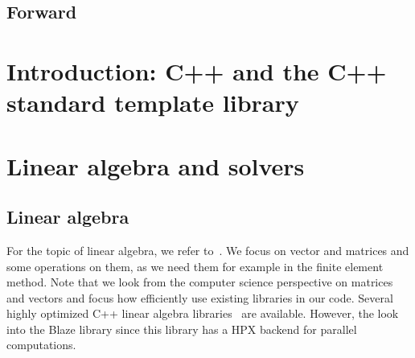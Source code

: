 \documentclass[11pt,fleqn]{book} %
\begin{document}
\tableofcontents %

\cleardoublepage %

\pagestyle{fancy} %

\chapter*{Forward}


\part{Introduction: C++ and the C++ standard template library}




\part{Linear algebra and solvers}

\chapter{Linear algebra}
For the topic of linear algebra, we refer to~\cite{hefferonlinear,scheick1997linear}. We focus on vector and matrices and some operations on them, as we need them for example in the finite element method. Note that we look from the computer science perspective on matrices and vectors and focus how efficiently use existing libraries in our code. Several highly optimized C++ linear algebra libraries~\cite{wang2013augem,eigenweb,rupp2016viennacl,sanderson2016armadillo} are available. However, the look into the Blaze library since this library has a HPX backend for parallel computations. 
\end{document}
